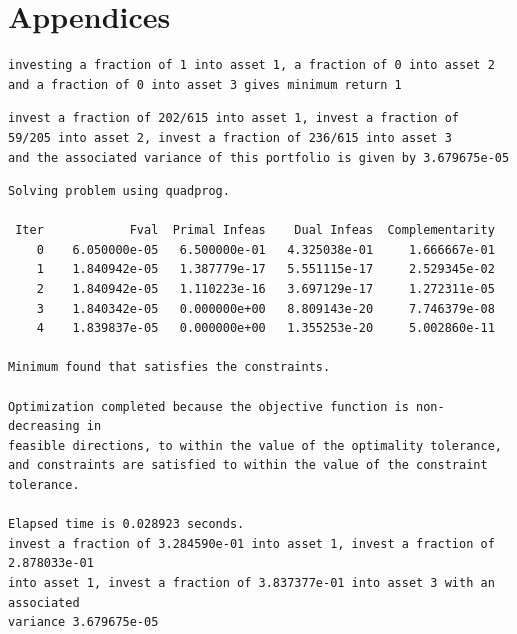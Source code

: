 \documentclass[11pt]{article}
\begin{document}
\section{Appendices}

\begin{verbatim}
investing a fraction of 1 into asset 1, a fraction of 0 into asset 2 
and a fraction of 0 into asset 3 gives minimum return 1
\end{verbatim}

\begin{verbatim}
invest a fraction of 202/615 into asset 1, invest a fraction of 
59/205 into asset 2, invest a fraction of 236/615 into asset 3
and the associated variance of this portfolio is given by 3.679675e-05
\end{verbatim}

\begin{verbatim}
Solving problem using quadprog.

 Iter            Fval  Primal Infeas    Dual Infeas  Complementarity  
    0    6.050000e-05   6.500000e-01   4.325038e-01     1.666667e-01  
    1    1.840942e-05   1.387779e-17   5.551115e-17     2.529345e-02  
    2    1.840942e-05   1.110223e-16   3.697129e-17     1.272311e-05  
    3    1.840342e-05   0.000000e+00   8.809143e-20     7.746379e-08  
    4    1.839837e-05   0.000000e+00   1.355253e-20     5.002860e-11  

Minimum found that satisfies the constraints.

Optimization completed because the objective function is non-decreasing in 
feasible directions, to within the value of the optimality tolerance,
and constraints are satisfied to within the value of the constraint tolerance.

Elapsed time is 0.028923 seconds.
invest a fraction of 3.284590e-01 into asset 1, invest a fraction of 2.878033e-01
into asset 1, invest a fraction of 3.837377e-01 into asset 3 with an associated
variance 3.679675e-05
\end{verbatim}
\end{document}
